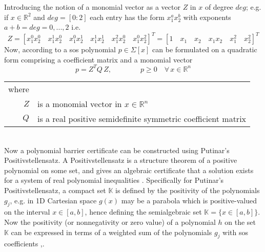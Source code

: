 Introducing the notion of a monomial vector as a vector $Z$ in $x$ of degree $deg$; e.g. if $x\in\mathbb{R}^2$ and $deg=[0:2]$ each entry has the form $x_1^ax_2^b$ with exponents $a+b=deg=0,...,2$ i.e.
\begin{equation}
Z=[x_1^0x_2^0\quad x_1^1x_2^0\quad x_1^0x_2^1\quad x_1^1x_2^1\quad x_1^2x_2^0\quad x_1^0x_2^2]^T=[1\quad x_1\quad x_2\quad x_1x_2\quad x_1^2\quad x_2^2]^T
\end{equation} 
Now, according to \citep{bib:parrilo_sdp} a \gls{sos} polynomial $p\in \Sigma[x]$ can be formulated on a quadratic form comprising a coefficient matrix and a monomial vector
\begin{equation}
p = Z^T Q \, Z, \qquad\qquad p\geq 0 \quad \forall \, x\in\mathbb{R}^n %
\label{eq:sos_polynomial}
\end{equation}
\begin{tabular}{rl}
where &\\
$Z$ & is a monomial vector in $x\in \mathbb{R}^n$\\
$Q$ & is a real positive semidefinite symmetric coefficient matrix\\
\end{tabular}\\

Now a polynomial barrier certificate can be constructed using Putinar's Positivstellensatz.
A Positivstellensatz is a structure theorem of a positive polynomial on some set, and gives an algebraic certificate that a solution exists for a system of real polynomial inequalities \citep{bib:positivstellensatz}. 
Specifically for Putinar's Positivstellensatz, a compact set $\mathbb{K}$ is defined by the positivity of the polynomials $g_j$, e.g. in 1D Cartesian space $g(x)$ may be a parabola which is positive-valued on the interval $x\in[a,b]$, hence defining the semialgebraic set $\mathbb{K}=\{x\in[a,b]\}$.
Now the positivity (or nonnegativity or zero value) of a polynomial $h$ on the set $\mathbb{K}$ can be expressed in terms of a weighted sum of the polynomials $g_j$ with \gls{sos} coefficients \citep[pp 184-186]{bib:sos_putinar_laurent},\citep[pp 28-29]{bib:sos_putinar_lasserre}.\\


